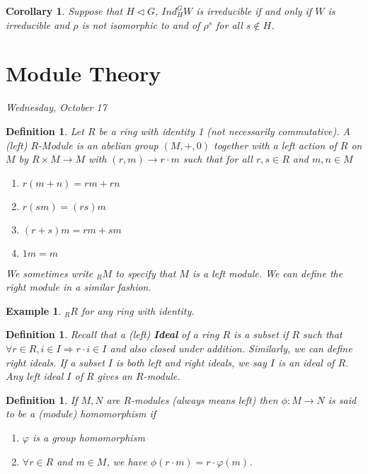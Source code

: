 \documentclass[letterpaper, leqno, 12pt]{article}
\newcommand{\fin}{\qquad \quad \hfill \framebox[1.75mm][l]{\,}}
\theoremstyle{stdthm}
\newtheorem{cor}[thm]{Corollary}
\theoremstyle{stddef}
\newtheorem{defn}[thm]{Definition}
\newtheorem{eg}[thm]{Example} %
\theoremstyle{stdnonum}
\theoremstyle{stdqands}
\theoremstyle{stdbold}
\begin{document}
\begin{cor}
Suppose that $H \lhd G$, $Ind_H^G W$ is irreducible if and only if $W$ is irreducible and $\rho$ is not isomorphic to and of $\rho^s$ for all $s \notin H$. 
\end{cor}

\newpage

\section{Module Theory}

\begin{center}
\emph{Wednesday, October 17}
\end{center}
\begin{defn}
Let $R$ be a ring with identity 1 (not necessarily commutative). A (left) $R$-Module is an abelian group $(M,+,0)$ together with a left action of $R$  on $M$ by $R\times M \rightarrow M$ with $(r,m) \rightarrow r \cdot m$ such that for all $r,s \in R$ and $m,n \in M$
\begin{enumerate}
\item $r(m+n) = rm + rn$
\item $r(sm) = (rs)m$
\item $(r+s)m = rm + sm$
\item $1m = m$
\end{enumerate}
We sometimes write $_RM$ to specify that $M$ is a left module. We can define the right module in a similar fashion. 
\end{defn}

\begin{eg}
 $_RR$ for any ring with identity. 
\end{eg}

\begin{defn}
Recall that a (left) {\bf Ideal} of a ring $R$ is a subset if $R$ such that $\forall r \in R, i \in I \Rightarrow r\cdot i \in I$ and also closed under addition. Similarly, we can define right ideals. If a subset $I$ is both left and right ideals, we say $I$ is an ideal of $R$. Any left ideal $I$ of $R$ gives an $R$-module. 
\end{defn}

\begin{defn}
If $M,N$ are $R$-modules (always means left) then $\phi: M \rightarrow N$ is said to be a (module) homomorphism if 
\begin{enumerate}
\item $\varphi$ is a group homomorphism
\item $\forall r\in R$ and $m\in M$, we have $\phi(r \cdot m) = r \cdot \varphi(m)$.
\end{enumerate}
\end{defn}
\end{document}
